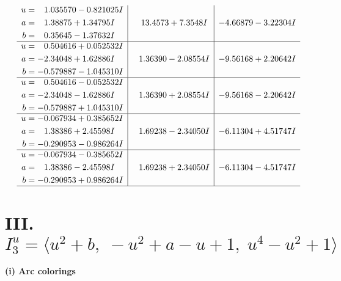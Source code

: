 \documentclass[1p]{elsarticle_modified}
\theoremstyle{definition}
\begin{document}
$$\begin{array}{c|c|c}
\begin{aligned}
u &= \phantom{-}1.035570 - 0.821025 I \\
a &= \phantom{-}1.38875 + 1.34795 I \\
b &= \phantom{-}0.35645 - 1.37632 I\end{aligned}
 & \phantom{-}13.4573 + 7.3548 I & -4.66879 - 3.22304 I \\ \hline\begin{aligned}
u &= \phantom{-}0.504616 + 0.052532 I \\
a &= -2.34048 + 1.62886 I \\
b &= -0.579887 - 1.045310 I\end{aligned}
 & \phantom{-}1.36390 - 2.08554 I & -9.56168 + 2.20642 I \\ \hline\begin{aligned}
u &= \phantom{-}0.504616 - 0.052532 I \\
a &= -2.34048 - 1.62886 I \\
b &= -0.579887 + 1.045310 I\end{aligned}
 & \phantom{-}1.36390 + 2.08554 I & -9.56168 - 2.20642 I \\ \hline\begin{aligned}
u &= -0.067934 + 0.385652 I \\
a &= \phantom{-}1.38386 + 2.45598 I \\
b &= -0.290953 - 0.986264 I\end{aligned}
 & \phantom{-}1.69238 - 2.34050 I & -6.11304 + 4.51747 I \\ \hline\begin{aligned}
u &= -0.067934 - 0.385652 I \\
a &= \phantom{-}1.38386 - 2.45598 I \\
b &= -0.290953 + 0.986264 I\end{aligned}
 & \phantom{-}1.69238 + 2.34050 I & -6.11304 - 4.51747 I\\
 \hline 
 \end{array}$$\newpage\newpage\renewcommand{\arraystretch}{1}
\centering \section*{III. $I^u_{3}= \langle u^2+b,\;- u^2+a- u+1,\;u^4- u^2+1 \rangle$}
\flushleft \textbf{(i) Arc colorings}\\
\end{document}
